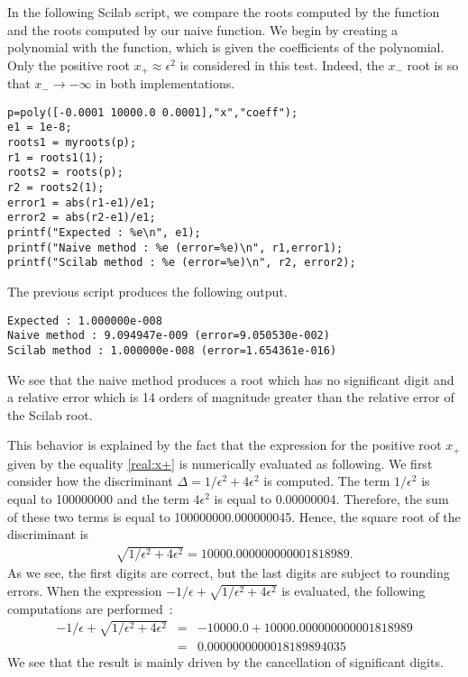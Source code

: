In the following Scilab script, we compare the roots computed by the 
function and the roots computed by our naive function. We begin by creating 
a polynomial with the  function, which is given the coefficients of 
the polynomial. Only the positive root $x_+ \approx \epsilon^2$ is considered in this 
test. Indeed, the $x_-$ root is so that $x_- \rightarrow -\infty$ in both 
implementations.
\lstset{language=scilabscript}
\begin{lstlisting}
p=poly([-0.0001 10000.0 0.0001],"x","coeff");
e1 = 1e-8;
roots1 = myroots(p);
r1 = roots1(1);
roots2 = roots(p);
r2 = roots2(1);
error1 = abs(r1-e1)/e1;
error2 = abs(r2-e1)/e1;
printf("Expected : %e\n", e1);
printf("Naive method : %e (error=%e)\n", r1,error1);
printf("Scilab method : %e (error=%e)\n", r2, error2);
\end{lstlisting}

The previous script produces the following output.
\lstset{language=scilabscript}
\begin{lstlisting}
Expected : 1.000000e-008
Naive method : 9.094947e-009 (error=9.050530e-002)
Scilab method : 1.000000e-008 (error=1.654361e-016)
\end{lstlisting}

We see that the naive method produces a root which has no significant digit 
and a relative error which is 14 orders of magnitude greater than the relative 
error of the Scilab root.

This behavior is explained by the fact that the expression for the 
positive root $x_+$ given by the equality \ref{real:x+} is numerically evaluated 
as following. We first consider how the discriminant $\Delta = 1/\epsilon^2+4\epsilon^2$ 
is computed. The term $1/\epsilon^2$ is equal to 100000000 and the term $4\epsilon^2$ 
is equal to 0.00000004. Therefore, the sum of these two terms is equal to 100000000.000000045.
Hence, the square root of the discriminant is 
\begin{eqnarray}
\sqrt{1/\epsilon^2+4\epsilon^2} = 10000.000000000001818989.
\end{eqnarray}
As we see, the first digits are correct, but the last digits 
are subject to rounding errors. When the expression $-1/\epsilon+ \sqrt{1/\epsilon^2+4\epsilon^2}$
is evaluated, the following computations are performed~:
\begin{eqnarray}
-1/\epsilon+ \sqrt{1/\epsilon^2+4\epsilon^2} &=& -10000.0 + 10000.000000000001818989 \\
  &=& 0.0000000000018189894035
\end{eqnarray}
We see that the result is mainly driven by the cancellation of significant digits.

